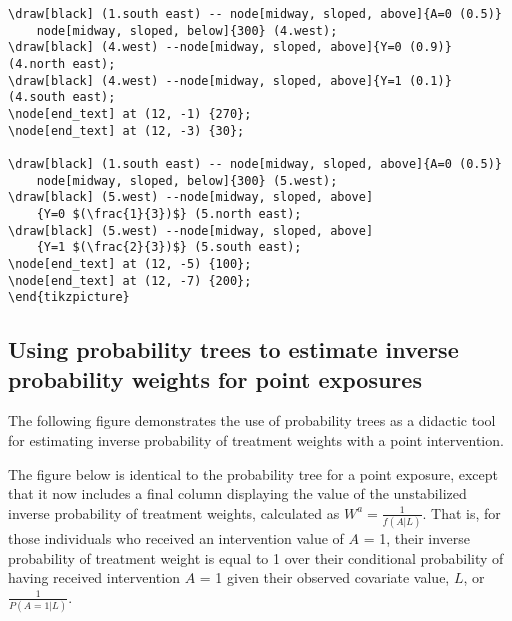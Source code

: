 \documentclass[a4paper]{report}
\begin{document}
\begin{framed}
\begin{Verbatim}
\draw[black] (1.south east) -- node[midway, sloped, above]{A=0 (0.5)} 
	node[midway, sloped, below]{300} (4.west);
\draw[black] (4.west) --node[midway, sloped, above]{Y=0 (0.9)} (4.north east);
\draw[black] (4.west) --node[midway, sloped, above]{Y=1 (0.1)} (4.south east);
\node[end_text] at (12, -1) {270};
\node[end_text] at (12, -3) {30};

\draw[black] (1.south east) -- node[midway, sloped, above]{A=0 (0.5)}
	node[midway, sloped, below]{300} (5.west);
\draw[black] (5.west) --node[midway, sloped, above]
	{Y=0 $(\frac{1}{3})$} (5.north east);
\draw[black] (5.west) --node[midway, sloped, above]
	{Y=1 $(\frac{2}{3})$} (5.south east);
\node[end_text] at (12, -5) {100};
\node[end_text] at (12, -7) {200};
\end{tikzpicture}
\end{Verbatim}

\end{framed}
\newpage
\subsection{Using probability trees to estimate inverse probability weights for point exposures}

The following figure demonstrates the use of probability trees as a didactic tool for estimating inverse probability of treatment weights with a point intervention.

The figure below is identical to the probability tree for a point exposure, except that it now includes a final column displaying the value of the unstabilized inverse probability of treatment weights, calculated as $W^a = \frac{1}{f\left(A|L\right)}$. That is, for those individuals who received an intervention value of $A$ = 1, their inverse probability of treatment weight is equal to 1 over their conditional probability of having received intervention $A$ = 1 given their observed covariate value, $L$, or $\frac{1}{P\left(A=1|L\right)}$. 


\vspace{3mm}
\end{document}
